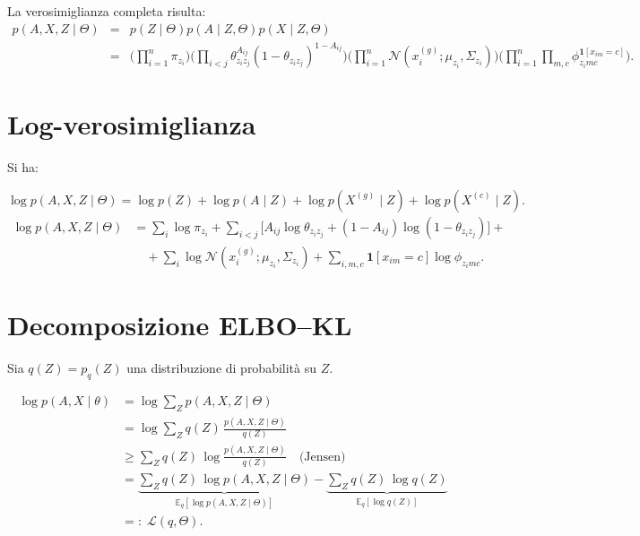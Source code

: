 \documentclass[11pt,a4paper]{article}
\begin{document}
La verosimiglianza completa risulta:
\begin{eqnarray*}
p(A,X,Z\mid\Theta)&=&p(Z\mid \Theta)p(A\mid Z,\Theta)p(X\mid Z,\Theta)\\
&=&
\Big(\prod_{i=1}^n \pi_{z_i}\Big)
\Big(\prod_{i<j}\theta_{z_iz_j}^{A_{ij}}(1-\theta_{z_iz_j})^{1-A_{ij}}\Big)
\Big(\prod_{i=1}^n \mathcal{N}(x_i^{(g)};\mu_{z_i},\Sigma_{z_i})\Big)
\Big(\prod_{i=1}^n\prod_{m,c}\phi_{z_i m c}^{\mathbf{1}[x_{im}=c]}\Big).
\end{eqnarray*}

\section{Log-verosimiglianza}
Si ha:

\[
\log p(A,X,Z\mid\Theta)
= \log p(Z)+ \log p(A \mid Z) + \log p(X^{(g)} \mid Z)
+ \log p(X^{(c)} \mid Z).
\]
\begin{align}
\log p(A,X,Z\mid\Theta)
&=\sum_i\log \pi_{z_i}+\sum_{i<j}\big[A_{ij}\log\theta_{z_i z_j}+(1-A_{ij})\log(1-\theta_{z_i z_j})\big]
+\nonumber\\
&\quad+\sum_i \log \mathcal{N}(x_i^{(g)};\mu_{z_i},\Sigma_{z_i})
+\sum_{i,m,c}\mathbf{1}[x_{im}=c]\log \phi_{z_i m c}.
\label{eq:logjoint}
\end{align}

\section{Decomposizione ELBO--KL}
Sia $q(Z)=p_q( Z)$ una distribuzione di probabilità su $Z$.

\begin{align}
\log p(A,X\mid\theta)
&=\log \sum_Z p(A,X,Z\mid \Theta) \label{eq:elbo1}\\
&=\log \sum_Z q(Z)\,\frac{p(A,X,Z\mid\Theta)}{q(Z)} \label{eq:elbo2}\\
&\ge \sum_Z q(Z)\,\log \frac{p(A,X,Z\mid\Theta)}{q(Z)} \quad\text{(Jensen)} \label{eq:elbo3}\\
&=\underbrace{\sum_Z q(Z)\,\log p(A,X,Z\mid\Theta)}_{\mathbb{E}_q[\log p(A,X,Z\mid\Theta)]}
-\underbrace{\sum_Z q(Z)\,\log q(Z)}_{\mathbb{E}_q[\log q(Z)]}\\
&=: \;\mathcal{L}(q,\Theta). \label{eq:elbo4}
\end{align}
\end{document}
